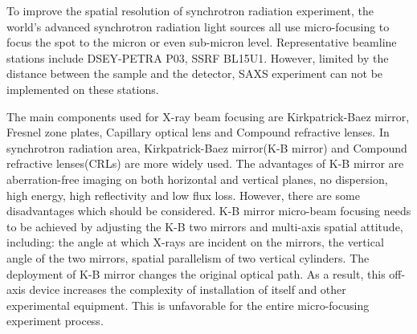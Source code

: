 \documentclass{Head}
\begin{document}
To improve the spatial resolution of synchrotron radiation experiment, the world’s advanced synchrotron radiation light sources all use micro-focusing to focus the spot to the micron or even sub-micron level.
Representative beamline stations include DSEY-PETRA \uppercase\expandafter{} P03, SSRF BL15U1.
However, limited by the distance between the sample and the detector, SAXS experiment can not be implemented on these stations.



The main components used for X-ray beam focusing are Kirkpatrick-Baez mirror, Fresnel zone plates, Capillary optical lens and Compound refractive lenses.
In synchrotron radiation area, Kirkpatrick-Baez mirror(K-B mirror) and Compound refractive lenses(CRLs) are more widely used.
The advantages of K-B mirror are aberration-free imaging on both horizontal and vertical planes, no dispersion, high energy, high reflectivity and low flux loss.
However, there are some disadvantages which should be considered.
K-B mirror micro-beam focusing needs to be achieved by adjusting the K-B two mirrors and multi-axis spatial attitude, including: the angle at which X-rays are incident on the mirrors, the vertical angle of the two mirrors, spatial parallelism of two vertical cylinders.
The deployment of K-B mirror changes the original optical path.
As a result, this off-axis device increases the complexity of installation of itself and other experimental equipment.
This is unfavorable for the entire micro-focusing experiment process.
\end{document}
